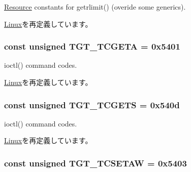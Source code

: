\hyperlink{classResource}{Resource} constants for getrlimit() (overide some generics). 

\hyperlink{classLinux_af16b609dcc51ebef365e8258e28d777c}{Linux}を再定義しています。\hypertarget{classMipsLinux_a804fc265279c5dbd78e0f95da998b267}{
\subsubsection[{TGT\_\-TCGETA}]{\setlength{\rightskip}{0pt plus 5cm}const unsigned {\bf TGT\_\-TCGETA} = 0x5401}}
\label{classMipsLinux_a804fc265279c5dbd78e0f95da998b267}


ioctl() command codes. 

\hyperlink{classLinux_a804fc265279c5dbd78e0f95da998b267}{Linux}を再定義しています。\hypertarget{classMipsLinux_a50e5d880569ec2cb9a2f3d4aaa55cc64}{
\subsubsection[{TGT\_\-TCGETS}]{\setlength{\rightskip}{0pt plus 5cm}const unsigned {\bf TGT\_\-TCGETS} = 0x540d}}
\label{classMipsLinux_a50e5d880569ec2cb9a2f3d4aaa55cc64}


ioctl() command codes. 

\hyperlink{classLinux_a50e5d880569ec2cb9a2f3d4aaa55cc64}{Linux}を再定義しています。\hypertarget{classMipsLinux_a96e06e042526ea5e89c4e8a020636c52}{
\subsubsection[{TGT\_\-TCSETAW}]{\setlength{\rightskip}{0pt plus 5cm}const unsigned {\bf TGT\_\-TCSETAW} = 0x5403}}
\label{classMipsLinux_a96e06e042526ea5e89c4e8a020636c52}


